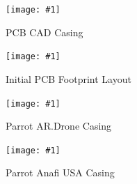\documentclass[12pt]{article}
\newcommand{\quickfigure}[4]{%
\begin{figure}[!htbp]
\centering
\texttt{[image: \#1]}
\caption{#3}
\label{#4}
\end{figure}%
}
\begin{document}
\quickfigure{images/PCB-CAD-drawing.png}{15cm}{PCB CAD Casing}{pcb-cad-casing}

\quickfigure{images/initial-PCB-footprint-layout.png}{15cm}{Initial PCB Footprint Layout}{initial-pcb-footprint-layout}

\quickfigure{images/parrot-AR-drone-casing.jpg}{15cm}{Parrot AR.Drone Casing}{parrot-ardrone-casing}

\quickfigure{images/parrot-anafi-USA-casing.jpg}{15cm}{Parrot Anafi USA Casing}{parrot-anafi-usa-casing}


\newpage
\end{document}
